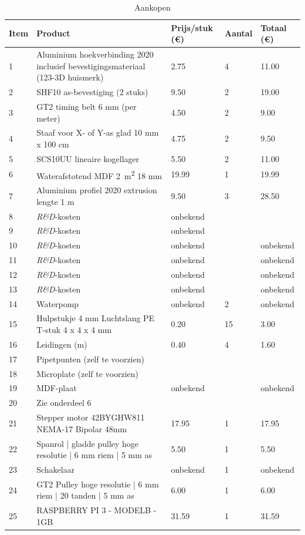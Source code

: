 \documentclass[a4paper,twoside,kulak]{kulakreport} %
\begin{document}
\begin{table}[!hbt]
	\noindent\makebox[\textwidth]
	\sffamily
	
	\caption{Aankopen}
		\begin{tabular}{|p{1cm}|p{5cm}|p{2cm}|p{2cm}|p{2cm}|}
			
		
		
		\toprule
		  Item & Product & Prijs/stuk (\euro) & Aantal & Totaal (\euro)   \\ \midrule
		1 & Aluminium hoekverbinding 2020 inclusief bevestigingsmateriaal (123-3D huismerk) & 2.75 & 4 & 11.00 \\
		2 & SHF10 as-bevestiging (2 stuks) & 9.50 & 2 & 19.00 \\
		3 & GT2 timing belt 6 mm (per meter)  & 4.50 & 2 & 9.00 \\
		4 & Staaf voor X- of Y-as glad 10 mm x 100 cm & 4.75 & 2 & 9.50 \\
		5 & SCS10UU lineaire kogellager  & 5.50 & 2 & 11.00 \\
		6 & Waterafstotend MDF \SI{2}{\metre\squared} 18 mm & 19.99 & 1 & 19.99 \\
		7 & Aluminium profiel 2020 extrusion lengte 1 m  & 9.50 & 3 & 28.50 \\
		8 & \textit{R\&D}-kosten & onbekend & &  \\
		9 & \textit{R\&D}-kosten & onbekend & &  \\
		10 & \textit{R\&D}-kosten & onbekend & & onbekend \\
		11 & \textit{R\&D}-kosten & onbekend & & onbekend\\
		12 & \textit{R\&D}-kosten & onbekend & & onbekend\\
		13 & \textit{R\&D}-kosten & onbekend & & onbekend\\
		14 & Waterpomp & onbekend & 2 & onbekend \\
		15 & Hulpstukje 4 mm Luchtslang PE T-stuk 4 x 4 x 4 mm & 0.20 & 15 & 3.00 \\
		16 & Leidingen (\si{m}) & 0.40 & 4 & 1.60 \\
		17 & Pipetpunten (zelf te voorzien) & & & \\
		18 & Microplate (zelf te voorzien) & & & \\
		19 & MDF-plaat & onbekend & & onbekend \\
		20 & Zie onderdeel 6 & & & \\
		21 & Stepper motor 42BYGHW811 NEMA-17 Bipolar 48mm & 17.95 & 1 & 17.95 \\
		22 & Spanrol | gladde pulley hoge resolutie | 6 mm riem | 5 mm as & 5.50 & 1 & 5.50 \\
		23 & Schakelaar & onbekend & 1 & onbekend \\
	    24 & GT2 Pulley hoge resolutie | 6 mm riem | 20 tanden | 5 mm as & 6.00 & 1 & 6.00 \\
	    25 & RASPBERRY PI 3 - MODELB - 1GB  & 31.59 & 1 & 31.59 \\
	    

\end{tabular}
\end{table}
\end{document}
